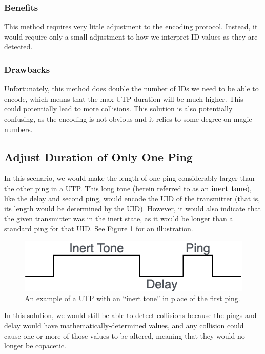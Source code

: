 \documentclass[12pt]{article}
\begin{document}
\subsubsection{Benefits}

This method requires very little adjustment to the encoding protocol.
Instead, it would require only a small adjustment to how we interpret ID values
as they are detected.

\subsubsection{Drawbacks}

Unfortunately, this method does double the number of IDs we need to be able to
encode, which means that the max UTP duration will be much higher.
This could potentially lead to more collisions.
This solution is also potentially confusing, as the encoding is not obvious
and it relies to some degree on magic numbers.

\subsection{Adjust Duration of Only One Ping}

In this scenario, we would make the length of one ping considerably larger
than the other ping in a UTP.
This long tone (herein referred to as an {\bf inert tone}),
like the delay and second ping, would encode the UID of the
transmitter (that is, its length would be determined by the UID).
However, it would also indicate that the given transmitter was in the inert
state, as it would be longer than a standard ping for that UID.
See Figure \ref{fig-inert} for an illustration.

\begin{figure}[h]
\centering
\includegraphics[scale=0.5]{inert_tone}

\caption{An example of a UTP with an ``inert tone'' in place of the first
ping.} \label{fig-inert}
\end{figure}

In this solution, we would still be able to detect collisions because the
pings and delay would have mathematically-determined values, and any collision
could cause one or more of those values to be altered, meaning that they
would no longer be copacetic.
\end{document}
